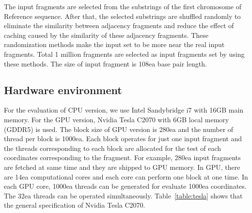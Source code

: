 The input fragments are selected from the substrings of the first chromosome of
Reference sequence. After that, the selected substrings are shuffled randomly
to eliminate the similarity between adjacency fragments and reduce the effect
of caching caused by the similarity of these adjacency fragments. These
randomization methods make the input set to be more near the real input
fragments. Total 1 million fragments are selected as input fragments set by
using these methods. The size of input fragment is 108ea base pair length.\\

\subsection{Hardware environment} \label{sec:method_hw}

For the evaluation of CPU version, we use Intel Sandybridge i7 with 16GB main
memory. For the GPU version, Nvidia Tesla C2070 with 6GB local memory (GDDR5)
is used. The block size of GPU version is 280ea and the number of thread per
block is 1000ea. Each block operates for just one input fragment and the
threads corresponding to each block are allocated for the test of each
coordinates corresponding to the fragment. For example, 280ea input fragments
are fetched at same time and they are shipped to GPU memory. In GPU, there are
14ea computational cores and each core can perform one block at one time. In
each GPU core, 1000ea threads can be generated for evaluate 1000ea coordinates.
The 32ea threads can be operated simultaneously. Table~\ref{table:tesla} shows
that the general specification of Nvidia Tesla C2070.\\

